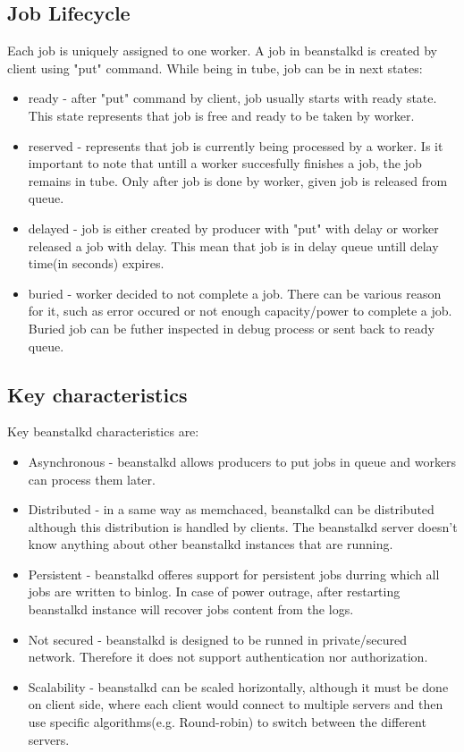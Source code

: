     \subsection{Job Lifecycle}
    Each job is uniquely assigned to one worker. A job in beanstalkd is created by client using "put" command. While being in tube, job can be in next states\cite{beanstalkdProtocol}:
    \begin{itemize}
        \item ready - after "put" command by client, job usually starts with ready state. This state represents that job is free and ready to be taken by worker.
        \item reserved - represents that job is currently being processed by a worker. Is it important to note that untill a worker succesfully finishes a job, the job remains in tube. Only after job is done by worker, given job is released from queue.
        \item delayed - job is either created by producer with "put" with delay or worker released a job with delay. This mean that job is in delay queue untill delay time(in seconds) expires.
        \item buried - worker decided to not complete a job. There can be various reason for it, such as error occured or not enough capacity/power to complete a job. Buried job can be futher inspected in debug process or sent back to ready queue.
    \end{itemize}


    \subsection{Key characteristics}
    Key beanstalkd characteristics are:
    \begin{itemize}
        \item Asynchronous - beanstalkd allows producers to put jobs in queue and workers can process them later.
        \item Distributed - in a same way as memchaced, beanstalkd can be distributed although this distribution is handled by clients. The beanstalkd server doesn't know anything about other beanstalkd instances that are running.
        \item Persistent - beanstalkd offeres support for persistent jobs durring which all jobs are written to binlog. In case of power outrage, after restarting beanstalkd instance will recover jobs content from the logs.
        \item Not secured - beanstalkd is designed to be runned in private/secured network. Therefore it does not support authentication nor authorization.
        \item Scalability - beanstalkd can be scaled horizontally, although it must be done on client side, where each client would connect to multiple servers and then use specific algorithms(e.g. Round-robin) to switch between the different servers.
    \end{itemize}

